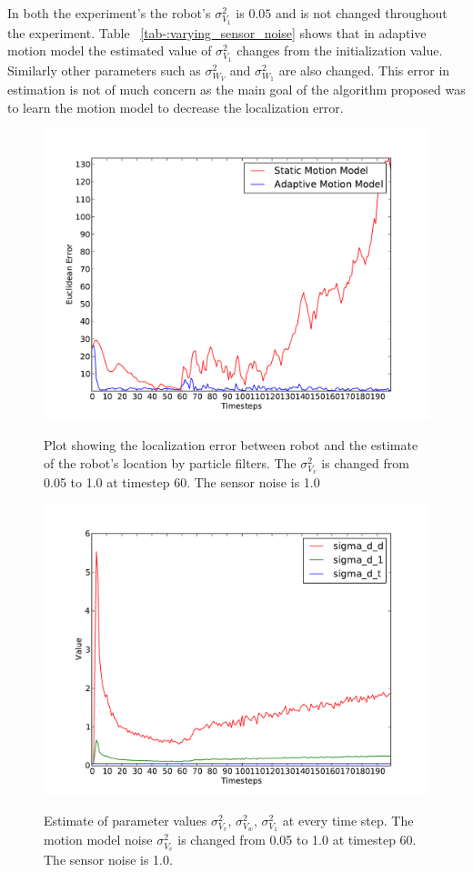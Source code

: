 \documentclass[12pt]{dalcsthesis}
\begin{document}
In both the experiment's the robot's $\sigma_{V_{1}}^2$ is $0.05$ and is not changed throughout the experiment. Table ~\ref{tab-:varying_sensor_noise} shows that in adaptive motion model the estimated value of $\sigma_{V_{1}}^2$ changes from the initialization value. Similarly other parameters such as $\sigma_{W_{V}}^2$ and $\sigma_{W_{1}}^2$ are also changed. This error in estimation is not of much concern as the main goal of the algorithm proposed was to learn the motion model to decrease the localization error. 

\begin{figure}
  \centering
     {\includegraphics[height = 3.0 in]{./plots/200_005_10_s_10.pdf}}
  \caption{\label{fig-varying_sensor_noise_1.0} Plot showing the localization error between robot and the estimate of the robot's location by particle filters. The $\sigma_{V_{v}}^{2}$ is changed from 0.05 to 1.0 at timestep 60. The sensor noise is 1.0}
\end{figure}
   
   
\begin{figure}
  \centering
     {\includegraphics[height = 3.0 in]{./plots/200_005_10_s_10_motion_model_trans.pdf}}
  \caption{\label{fig-varying_sensor_noise_motion_model_1.0}Estimate of parameter values $\sigma_{V_{v}}^{2}$, $\sigma_{V_{w}}^{2}$,  $\sigma_{V_{1}}^{2}$ at every time step. The motion model noise $\sigma_{V_{v}}^{2}$ is changed from 0.05 to 1.0 at timestep 60. The sensor noise is 1.0.}
\end{figure}
\end{document}
